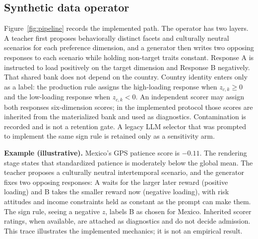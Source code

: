 \documentclass[10pt,letterpaper]{article}
\begin{document}
\subsection{Synthetic data operator}
Figure~\ref{fig:pipeline} records the implemented path. The operator has two layers. A teacher first proposes behaviorally distinct facets and culturally neutral scenarios for each preference dimension, and a generator then writes two opposing responses to each scenario while holding non-target traits constant. Response A is instructed to load positively on the target dimension and Response B negatively. That shared bank does not depend on the country. Country identity enters only as a label: the production rule assigns the high-loading response when $z_{c,k}\ge 0$ and the low-loading response when $z_{c,k}<0$. An independent scorer may assign both responses six-dimension scores; in the implemented protocol those scores are inherited from the materialized bank and used as diagnostics. Contamination is recorded and is not a retention gate. A legacy LLM selector that was prompted to implement the same sign rule is retained only as a sensitivity arm.

\noindent\textbf{Example (illustrative).} Mexico's GPS patience score is $-0.11$. The rendering stage states that standardized patience is moderately below the global mean. The teacher proposes a culturally neutral intertemporal scenario, and the generator fixes two opposing responses: A waits for the larger later reward (positive loading) and B takes the smaller reward now (negative loading), with risk attitudes and income constraints held as constant as the prompt can make them. The sign rule, seeing a negative $z$, labels B as chosen for Mexico. Inherited scorer ratings, when available, are attached as diagnostics and do not decide admission. This trace illustrates the implemented mechanics; it is not an empirical result.
\end{document}
